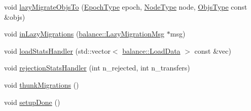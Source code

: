 \begin{DoxyCompactItemize}
\item 
void \hyperlink{structvt_1_1vrt_1_1collection_1_1lb_1_1_tempered_l_b_a00af3637cea1d345fea518d2608d5596}{lazy\+Migrate\+Objs\+To} (\hyperlink{namespacevt_a81d11b28122d43bf9834577e4a06440f}{Epoch\+Type} epoch, \hyperlink{namespacevt_a866da9d0efc19c0a1ce79e9e492f47e2}{Node\+Type} node, \hyperlink{structvt_1_1vrt_1_1collection_1_1lb_1_1_tempered_l_b_ad54faf59319f1b33dec689ee853d688e}{Objs\+Type} const \&objs)
\item 
void \hyperlink{structvt_1_1vrt_1_1collection_1_1lb_1_1_tempered_l_b_aa072b3bf3c82899d3228096b60de1647}{in\+Lazy\+Migrations} (\hyperlink{structvt_1_1vrt_1_1collection_1_1balance_1_1_lazy_migration_msg}{balance\+::\+Lazy\+Migration\+Msg} $\ast$msg)
\item 
void \hyperlink{structvt_1_1vrt_1_1collection_1_1lb_1_1_tempered_l_b_a8bc08859b2c38e6fa0c6f0d0262f8118}{load\+Stats\+Handler} (std\+::vector$<$ \hyperlink{structvt_1_1vrt_1_1collection_1_1balance_1_1_load_data}{balance\+::\+Load\+Data} $>$ const \&vec)
\item 
void \hyperlink{structvt_1_1vrt_1_1collection_1_1lb_1_1_tempered_l_b_a0880a16358ee528c868186ceaed9245f}{rejection\+Stats\+Handler} (int n\+\_\+rejected, int n\+\_\+transfers)
\item 
void \hyperlink{structvt_1_1vrt_1_1collection_1_1lb_1_1_tempered_l_b_ad17685a3f16fd1e56e7db27b6ab702ca}{thunk\+Migrations} ()
\item 
void \hyperlink{structvt_1_1vrt_1_1collection_1_1lb_1_1_tempered_l_b_abd832c27fec041a5cce45d0a41585c3d}{setup\+Done} ()
\end{DoxyCompactItemize}
